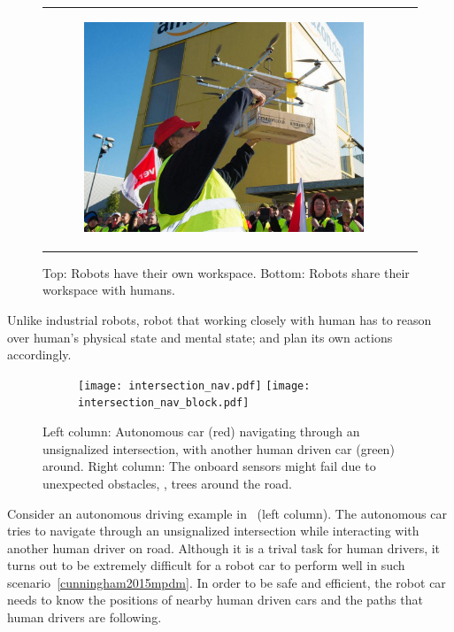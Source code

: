 \documentclass{article}
\begin{document}
\begin{figure}[t!]
\begin{tabular}{rr}
\begin{subfigure}{1.0\linewidth}
            \includegraphics[width=.3\linewidth]{figs/drone_delivery.pdf} 
        \end{subfigure}
    \end{tabular}
    \caption{Top: Robots have their own workspace.
        Bottom: Robots share their workspace with humans.}
    \label{fig:robots}
\end{figure}

Unlike industrial robots,
robot that working closely with human has to 
reason over human's 
physical state and mental state;
and plan its own actions accordingly.

\begin{figure}[!h]
    \centering
    \begin{subfigure}{1.0\linewidth}
        \centering
        \texttt{[image: intersection\_nav.pdf]}
        \hspace{1.5cm}
        \texttt{[image: intersection\_nav\_block.pdf]}
    \end{subfigure}
    \caption{Left column:
        Autonomous car (red) navigating through an unsignalized 
        intersection, with another human driven car (green) around. 
        Right column:
        The onboard sensors might fail due to unexpected obstacles,
        \eg, trees around the road.
    }
    \label{fig:intersection_nav}
\end{figure}


Consider an autonomous driving example in~ (left column).
The autonomous car tries to navigate through an unsignalized intersection
while interacting with another human driver on road. 
Although it is a trival task for human drivers, it
turns out to be extremely difficult for a robot car to perform 
well in such scenario~\cref{cunningham2015mpdm}. 
In order to be safe and efficient, 
the robot car needs to 
know the positions of nearby human driven cars and the paths that 
human drivers are following.
\end{document}
